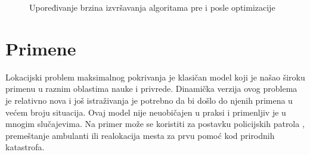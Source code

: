 \documentclass[a4paper]{article}
\begin{document}
\begin{figure}%
	\centering
	\qquad
	\caption{Upoređivanje brzina izvršavanja algoritama pre i posle optimizacije}%
	\label{fig1}%
\end{figure}

\section{Primene}
Lokacijski problem maksimalnog pokrivanja je klasičan model koji je našao široku primenu u raznim oblastima nauke i privrede. Dinamička verzija ovog problema je relativno nova i još istraživanja je potrebno da bi došlo do njenih primena u većem broju situacija. Ovaj model nije neuobičajen u praksi i primenljiv je u mnogim slučajevima. Na primer može se koristiti za postavku policijskih patrola \cite{police}, premeštanje ambulanti \cite{ambulance} ili realokacija mesta za prvu pomoć kod prirodnih katastrofa.

\appendix
 

\end{document}
